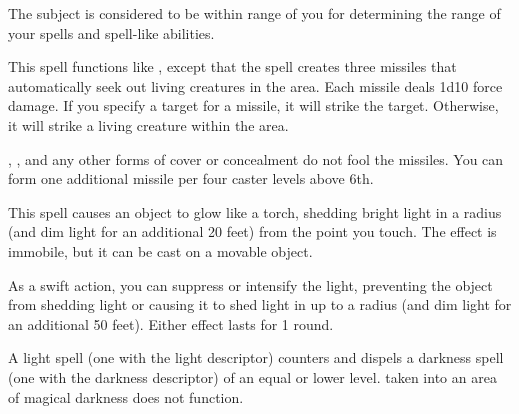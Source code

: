 \spellrng{\rngfar}
\begin{spelleffect}
  The subject is considered to be within \rngclose range of you for determining the range of your spells and spell-like abilities.
\end{spelleffect}

\spellrng{\rngmed}
\begin{spelleffect}
  This spell functions like , except that the spell creates three missiles that automatically seek out living creatures in the area. Each missile deals 1d10 force damage. If you specify a target for a missile, it will strike the target. Otherwise, it will strike a living creature within the area.
  
  , , and any other forms of cover or concealment do not fool the missiles. You can form one additional missile per four caster levels above 6th.
\end{spelleffect}

\spellrng{\rngtouch}
\begin{spelleffect}
  This spell causes an object to glow like a torch, shedding bright light in a \areamed radius (and dim light for an additional 20 feet) from the point you touch. The effect is immobile, but it can be cast on a movable object.
  
  As a swift action, you can suppress or intensify the light, preventing the object from shedding light or causing it to shed light in up to a \arealarge radius (and dim light for an additional 50 feet). Either effect lasts for 1 round.
\end{spelleffect}
\begin{spellnotes}
  A light spell (one with the light descriptor) counters and dispels a darkness spell (one with the darkness descriptor) of an equal or lower level.  taken into an area of magical darkness does not function.
\end{spellnotes}

